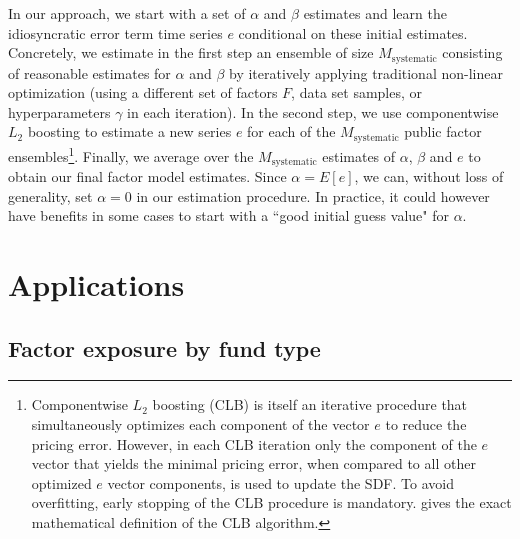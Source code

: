 \documentclass[12pt]{article}
\begin{document}
In our approach, we start with a set of $\alpha$ and $\beta$ estimates and learn the idiosyncratic error term time series $e$ conditional on these initial estimates.
Concretely, we estimate in the first step an ensemble of size $M_{\mathrm{systematic}}$ consisting of reasonable estimates for $\alpha$ and $\beta$ by iteratively applying traditional non-linear optimization (using a different set of factors $F$, data set samples, or hyperparameters $\gamma$ in each iteration).
In the second step, we use componentwise $L_2$ boosting to estimate a new series $e$ for each of the $M_{\mathrm{systematic}}$ public factor ensembles\footnote{
Componentwise $L_2$ boosting (CLB) is itself an iterative procedure that simultaneously optimizes each component of the vector $e$ to reduce the pricing error.
However, in each CLB iteration only the component of the $e$ vector that yields the minimal pricing error, when compared to all other optimized $e$ vector components, is used to update the SDF.
To avoid overfitting, early stopping of the CLB procedure is mandatory.
\citep[Section 2]{B06} gives the exact mathematical definition of the CLB algorithm.
}.
Finally, we average over the $M_{\mathrm{systematic}}$ estimates of $\alpha$, $\beta$ and $e$ to obtain our final factor model estimates.
Since $\alpha=E[e]$, we can, without loss of generality, set $\alpha=0$ in our estimation procedure.
In practice, it could however have benefits in some cases to start with a ``good initial guess value" for $\alpha$.

\section{Applications}
\label{sec:applications}

\subsection{Factor exposure by fund type}
\label{sec:factor_exposure}
\end{document}
